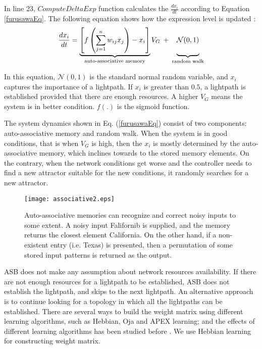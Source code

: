 \documentclass[conference]{IEEEtran}
\begin{document}
In line 23, $ComputeDeltaExp$ function calculates the  $\frac{dx_i}{dt}$ according to Equation \ref{furusawaEq}.
The following equation shows how the expression level is updated \cite{Koizumi:10}: 
{  \begin{equation} \label{furusawaEq}
\frac{dx_i}{dt}= \underbrace{ \left[ f\left( \sum_{j=1}^n w_{ij} x_j   \right) - x_i \right]}_\text{auto-associative memory} V_G\: +\: 
 \underbrace{\vphantom{  f\left( \sum_{j=1}^n w_{ij} x_j   \right)  } \mathcal{N}(0,1)}_\text{random walk}
 \end{equation}  } 

 In this equation, $\mathcal{N}(0,1)$ is the standard normal random variable, and  $x_i$  captures the importance of a lightpath. 
If $x_i$ is greater than $0.5$,
 a lightpath is established provided that there are enough resources. A higher   $V_G$ means the system is in better condition. 
$f(.)$ is the sigmoid function. 
  
The system dynamics shown in Eq. (\ref{furusawaEq}) consist of two components: auto-associative memory and random walk.
When the system is in good conditions,
that is when $V_G$ is high, then the $x_i$ is mostly determined by the auto-associative memory,
which inclines towards to the stored memory elements.
On the contrary, when the network conditions get  worse and the controller needs to find a new attractor suitable for the new conditions, 
it randomly  searches for a new attractor. 

 \begin{figure}[t] 
\centering
  \texttt{[image: associative2.eps]}
\caption{ Auto-associative memories can recognize and correct noisy inputs to some extent.
A noisy input Falifornib is supplied, and the memory returns the closest element California.
On the other hand, if a non-existent entry (i.e. Texas) is presented, then a permutation of some stored input patterns is returned as the output. 
}
\label{auto_asso}
\end{figure} 
 
ASB does not make any assumption about network resources availability. 
If there are not enough resources for a lightpath to be established,
 ASB does not establish the lightpath, and skips to the next lightpath. 
An alternative approach is to continue looking for a topology  in which all the lightpaths can be established.
There are several ways to build  the weight matrix using different learning algorithms, such as Hebbian, Oja and APEX learning; 
and the effects of different learning algorithms has been studied before \cite{Hanay:VNT012}.
We use Hebbian learning for constructing weight matrix. 
\end{document}
